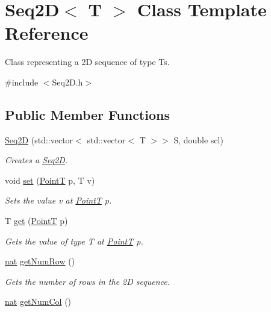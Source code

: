 \hypertarget{class_seq2_d}{}\section{Seq2D$<$ T $>$ Class Template Reference}
\label{class_seq2_d}


Class representing a 2D sequence of type T\textquotesingle{}s.  




{\ttfamily \#include $<$Seq2\+D.\+h$>$}

\subsection*{Public Member Functions}
\begin{DoxyCompactItemize}
\item 
\mbox{\hyperlink{class_seq2_d_a3575add9a5feb2d1981eba9ee2c42512}{Seq2D}} (std\+::vector$<$ std\+::vector$<$ T $>$$>$ S, double scl)
\begin{DoxyCompactList}\small\item\em Creates a \mbox{\hyperlink{class_seq2_d}{Seq2D}}. \end{DoxyCompactList}\item 
void \mbox{\hyperlink{class_seq2_d_aac0f9bedacb88caa2e748a07a81639d5}{set}} (\mbox{\hyperlink{class_point_t}{PointT}} p, T v)
\begin{DoxyCompactList}\small\item\em Sets the value v at \mbox{\hyperlink{class_point_t}{PointT}} p. \end{DoxyCompactList}\item 
T \mbox{\hyperlink{class_seq2_d_af4f1cf4ccf0e0d6bcba5a52f984877cc}{get}} (\mbox{\hyperlink{class_point_t}{PointT}} p)
\begin{DoxyCompactList}\small\item\em Gets the value of type T at \mbox{\hyperlink{class_point_t}{PointT}} p. \end{DoxyCompactList}\item 
\mbox{\hyperlink{_path_a_d_t_8h_a56638ee9d162e8cce3a15f92d2023d6e}{nat}} \mbox{\hyperlink{class_seq2_d_acd9009bd107c4408a10baf540aa69858}{get\+Num\+Row}} ()
\begin{DoxyCompactList}\small\item\em Gets the number of rows in the 2D sequence. \end{DoxyCompactList}\item 
\mbox{\hyperlink{_path_a_d_t_8h_a56638ee9d162e8cce3a15f92d2023d6e}{nat}} \mbox{\hyperlink{class_seq2_d_a4a38e61808f6c856bd46a47a0fbb183f}{get\+Num\+Col}} ()
$$
\end{DoxyCompactItemize}
